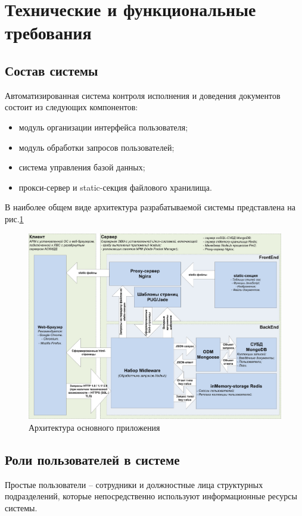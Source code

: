 \documentclass[russian]{eskdtext}
\begin{document}
\section{Технические и функциональные требования}
\subsection{Состав системы}
Автоматизированная система контроля исполнения и доведения документов состоит из следующих компонентов:
\begin{itemize}
	\item модуль организации интерфейса пользователя;
	\item модуль обработки запросов пользователей;
	\item система управления базой данных;
	\item прокси-сервер и static-секция файлового хранилища.
\end{itemize}

В наиболее общем виде архитектура разрабатываемой системы представлена на рис.\ref{fig:arch}
\begin{figure}
	\centering
	\includegraphics[width=1.0\linewidth]{img/archs_jpeg}
	\caption[Архитектура]{Архитектура основного приложения}
	\label{fig:arch}
\end{figure}

\subsection{Роли пользователей в системе}
Простые пользователи -- сотрудники и должностные лица структурных подразделений, которые непосредственно используют информационные ресурсы системы.
\end{document}
